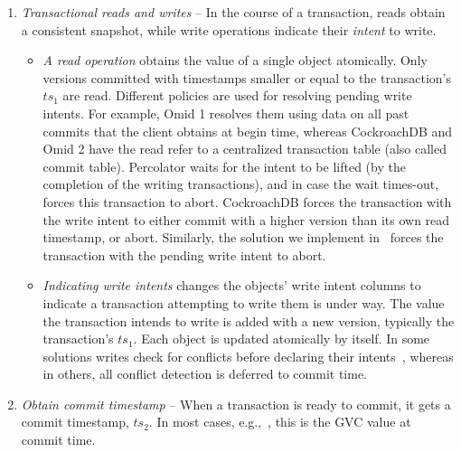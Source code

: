 \begin{enumerate}
  \item \emph{Transactional reads and writes} -- 
 In the course of a transaction, reads  obtain a consistent snapshot,
 while write operations indicate their \emph{intent} to write. 
  	 	\begin{itemize}
  		\item  \emph{A read operation} obtains the value of a single object atomically. 
  		Only versions committed with timestamps  smaller or equal to the transaction's $ts_1$ are read. 
 		Different  policies are used for resolving pending write intents. For example, Omid 1 resolves them 
 		using data on all past commits that the client obtains at begin time, whereas CockroachDB and Omid 2 
 		have the read refer to a centralized transaction table (also called commit table). 
		Percolator  waits for the intent to be lifted (by the completion of the writing transactions), and in case the wait times-out, 
		forces this transaction to abort. 
	 	 CockroachDB forces the transaction with the write intent to either commit with a higher version 
  		than its own read timestamp, or abort. Similarly, the solution we implement in \sys\ forces the transaction with the pending write 
  		intent to abort. 
  		\item \emph{Indicating write intents} changes the objects' write intent columns
  		to indicate a transaction attempting to write them is under way. The value the
  		transaction intends to write is added with a new version, typically the transaction's $ts_1$.
		Each object is updated atomically by itself. 
		In some solutions writes check for conflicts before declaring their intents~\cite{cockroach}, whereas in others, 
		all conflict detection is deferred to commit time. 
  	\end{itemize}
  \item \emph{Obtain commit timestamp} --
  When a transaction is ready to commit, it gets a commit timestamp, $ts_2$. 
  In most cases, e.g.,~\cite{Percolator2010,tephra,OmidICDE2014,omid-blog}, 
  this is the GVC value at commit time. 

\end{enumerate}
